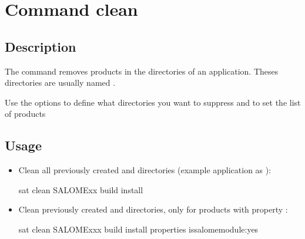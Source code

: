 \documentclass[a4paper,10pt,english]{sphinxmanual}
\begin{document}
\clearpage


\section{Command clean}
\label{\detokenize{commands/clean:svn}}\label{\detokenize{commands/clean:command-clean}}\label{\detokenize{commands/clean::doc}}

\subsection{Description}
\label{\detokenize{commands/clean:description}}
The  command removes products in the  directories of an application. Theses directories are usually named .

Use the options to define what directories you want to suppress and to set the list of products


\subsection{Usage}
\label{\detokenize{commands/clean:usage}}\begin{itemize}
\item {} 
Clean all previously created  and  directories (example application as ):

%
\begin{sphinxVerbatim}[commandchars=\\\{\}]
sat clean SALOME\PYGZhy{}xx \PYGZhy{}\PYGZhy{}build \PYGZhy{}\PYGZhy{}install
\end{sphinxVerbatim}

\item {} 
Clean previously created  and  directories, only for products with property :

%
\begin{sphinxVerbatim}[commandchars=\\\{\}]
sat clean SALOME\PYGZhy{}xxx \PYGZhy{}\PYGZhy{}build \PYGZhy{}\PYGZhy{}install 
                     \PYGZhy{}\PYGZhy{}properties is\PYGZus{}salome\PYGZus{}module:yes
\end{sphinxVerbatim}

\end{itemize}
\end{document}
